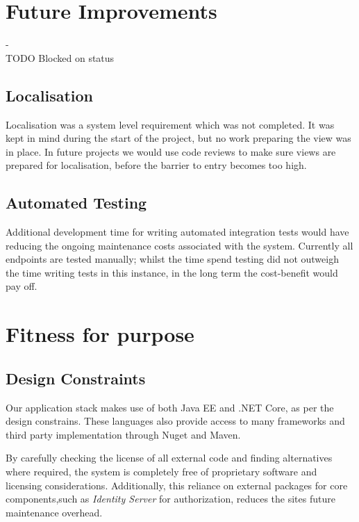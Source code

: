 \section{Future Improvements}

- \\TODO Blocked on status

    \subsection{Localisation}
    \par
    Localisation was a system level requirement which was not completed. It was kept in mind during the start of the project, but no work preparing the view was in place. In future projects we would use code reviews to make sure views are prepared for localisation, before the barrier to entry becomes too high.

    \subsection{Automated Testing}
    \par
    Additional development time for writing automated integration tests would have reducing the ongoing maintenance costs associated with the system. Currently all endpoints are tested manually; whilst the time spend testing did not outweigh the time writing tests in this instance, in the long term the cost-benefit would pay off.

\section{Fitness for purpose}
    \subsection{Design Constraints}
    \par
    Our application stack makes use of both Java EE and .NET Core, as per the design constrains. These languages also provide access to many frameworks and third party implementation through Nuget and Maven. 
    
    \par
    By carefully checking the license of all external code and finding alternatives where required, the system is completely free of proprietary software and licensing considerations. Additionally, this reliance on external packages for core components,such as \textit{Identity Server} for authorization, reduces the sites future maintenance overhead.

